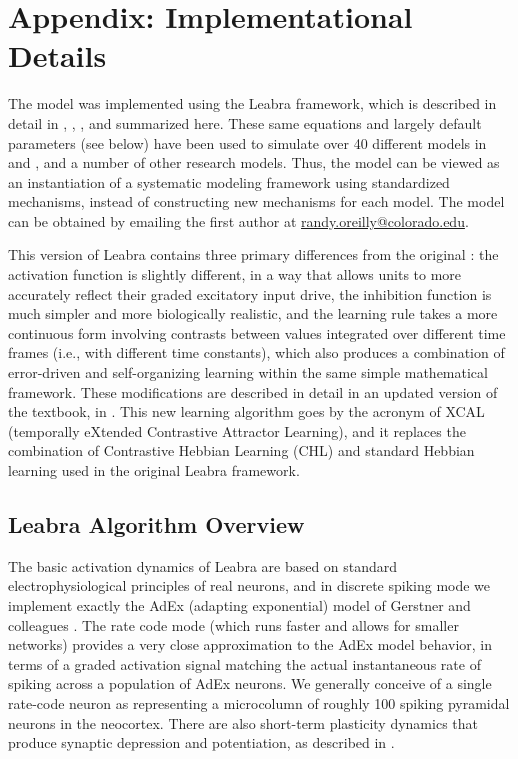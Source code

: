 \section{Appendix: Implementational Details}


The model was implemented using the Leabra framework, which is described in detail in , , , and summarized here.  These same equations and largely default parameters (see below) have been used to simulate over 40 different models in  and , and a number of other research models.  Thus, the model can be viewed as an instantiation of a systematic modeling framework using standardized mechanisms, instead of constructing new mechanisms for each model.  The model can be obtained by emailing the first author at \url{randy.oreilly@colorado.edu}.

This version of Leabra contains three primary differences from the original \cite{OReillyMunakata00}: the activation function is slightly different, in a way that allows units to more accurately reflect their graded excitatory input drive, the inhibition function is much simpler and more biologically realistic, and the learning rule takes a more continuous form involving contrasts between values integrated over different time frames (i.e., with different time constants), which also produces a combination of error-driven and self-organizing learning within the same simple mathematical framework.  These modifications are described in detail in an updated version of the  textbook, in .  This new learning algorithm goes by the acronym of XCAL (temporally eXtended Contrastive Attractor Learning), and it replaces the combination of Contrastive Hebbian Learning (CHL) and standard Hebbian learning used in the original Leabra framework.

\subsection{Leabra Algorithm Overview}

The basic activation dynamics of Leabra are based on standard electrophysiological principles of real neurons, and in discrete spiking mode we implement exactly the AdEx (adapting exponential) model of Gerstner and colleagues \cite{BretteGerstner05}. The rate code mode (which runs faster and allows for smaller networks) provides a very close approximation to the AdEx model behavior, in terms of a graded activation signal matching the actual instantaneous rate of spiking across a population of AdEx neurons. We generally conceive of a single rate-code neuron as representing a microcolumn of roughly 100 spiking pyramidal neurons in the neocortex. There are also short-term plasticity dynamics that produce synaptic depression and potentiation, as described in .

